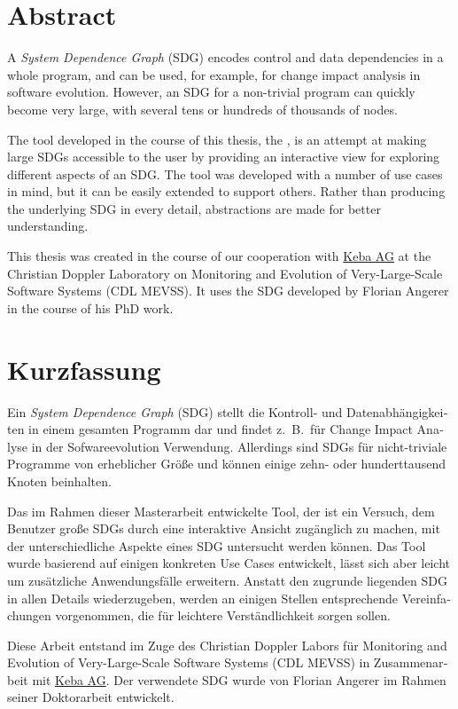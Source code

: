 \chapter*{Abstract} \vspace{-0.5cm}

A \emph{System Dependence Graph} (SDG) encodes control and data dependencies in a whole program, and can be used, for 
example, for change impact analysis in software evolution. However, an SDG for a non-trivial program can quickly become 
very large, with several tens or hundreds of thousands of nodes.

The tool developed in the course of this thesis, the \emph{\SB}, is an attempt at making large SDGs accessible to the 
user by providing an interactive view for exploring different aspects of an SDG. The tool was developed with a number 
of use cases in mind, but it can be easily extended to support others. Rather than producing the underlying SDG in 
every detail, abstractions are made for better understanding.

This thesis was created in the course of our cooperation with \href{http://www.keba.com}{Keba AG} at the Christian 
Doppler Laboratory on Monitoring and Evolution of Very-Large-Scale Software Systems (CDL MEVSS). It uses the SDG 
developed by Florian Angerer in the course of his PhD work.


\chapter*{Kurzfassung}

\begin{otherlanguage}{ngerman}

Ein \emph{System Dependence Graph} (SDG) stellt die Kontroll- und Datenabhängigkeiten in einem gesamten Programm dar 
und findet z.\ B.\ für Change Impact Analyse in der Sofwareevolution Verwendung. Allerdings sind SDGs für 
nicht-triviale Programme von erheblicher Größe und können einige zehn- oder hunderttausend Knoten beinhalten.

Das im Rahmen dieser Masterarbeit entwickelte Tool, der \emph{\SB} ist ein Versuch, dem Benutzer große SDGs durch eine 
interaktive Ansicht zugänglich zu machen, mit der unterschiedliche Aspekte eines SDG untersucht werden können. Das Tool 
wurde basierend auf einigen konkreten Use Cases entwickelt, lässt sich aber leicht um zusätzliche Anwendungsfälle 
erweitern. Anstatt den zugrunde liegenden SDG in allen Details wiederzugeben, werden an einigen Stellen entsprechende 
Vereinfachungen vorgenommen, die für leichtere Verständlichkeit sorgen sollen.

Diese Arbeit entstand im Zuge des Christian Doppler Labors für Monitoring and Evolution of Very-Large-Scale Software 
Systems (CDL MEVSS) in Zusammenarbeit mit \href{http://www.keba.com}{Keba AG}. Der verwendete SDG wurde von Florian 
Angerer im Rahmen seiner Doktorarbeit entwickelt.

\end{otherlanguage}
